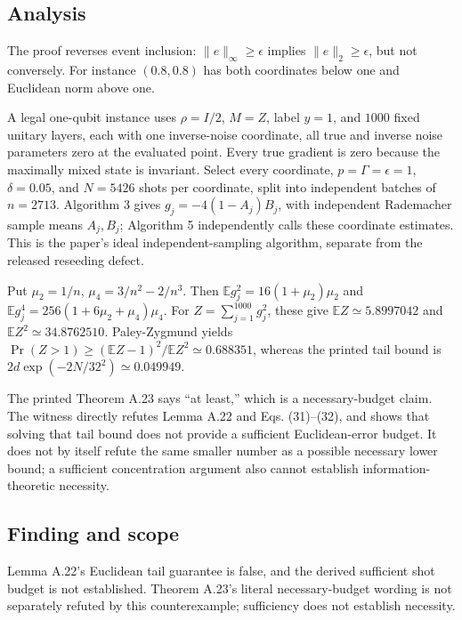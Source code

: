 \documentclass[11pt]{article}
\begin{document}
\subsection*{Analysis}

The proof reverses event inclusion: \(\|e\|_\infty\ge\epsilon\) implies \(\|e\|_2\ge\epsilon\), but not conversely. For instance \((0.8,0.8)\) has both coordinates below one and Euclidean norm above one.

A legal one-qubit instance uses \(\rho=I/2\), \(M=Z\), label \(y=1\), and \(1000\) fixed unitary layers, each with one inverse-noise coordinate, all true and inverse noise parameters zero at the evaluated point. Every true gradient is zero because the maximally mixed state is invariant. Select every coordinate, \(p=\Gamma=\epsilon=1\), \(\delta=0.05\), and \(N=5426\) shots per coordinate, split into independent batches of \(n=2713\). Algorithm 3 gives \(g_j=-4(1-A_j)B_j\), with independent Rademacher sample means \(A_j,B_j\); Algorithm 5 independently calls these coordinate estimates. This is the paper’s ideal independent-sampling algorithm, separate from the released reseeding defect.

Put \(\mu_2=1/n\), \(\mu_4=3/n^2-2/n^3\). Then \(\mathbb Eg_j^2=16(1+\mu_2)\mu_2\) and \(\mathbb Eg_j^4=256(1+6\mu_2+\mu_4)\mu_4\). For \(Z=\sum_{j=1}^{1000}g_j^2\), these give \(\mathbb EZ\simeq5.8997042\) and \(\mathbb EZ^2\simeq34.8762510\). Paley-Zygmund yields \(\Pr(Z>1)\ge(\mathbb EZ-1)^2/\mathbb EZ^2\simeq0.688351\), whereas the printed tail bound is \(2d\exp(-2N/32^2)\simeq0.049949\).

The printed Theorem A.23 says “at least,” which is a necessary-budget claim. The witness directly refutes Lemma A.22 and Eqs. (31)–(32), and shows that solving that tail bound does not provide a sufficient Euclidean-error budget. It does not by itself refute the same smaller number as a possible necessary lower bound; a sufficient concentration argument also cannot establish information-theoretic necessity.

\subsection*{Finding and scope}

Lemma A.22's Euclidean tail guarantee is false, and the derived sufficient shot budget is not established. Theorem A.23's literal necessary-budget wording is not separately refuted by this counterexample; sufficiency does not establish necessity.
\end{document}
